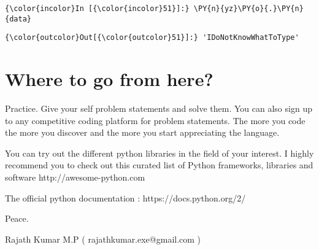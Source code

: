     \begin{Verbatim}[commandchars=\\\{\}]
{\color{incolor}In [{\color{incolor}51}]:} \PY{n}{yz}\PY{o}{.}\PY{n}{data}
\end{Verbatim}

            \begin{Verbatim}[commandchars=\\\{\}]
{\color{outcolor}Out[{\color{outcolor}51}]:} 'IDoNotKnowWhatToType'
\end{Verbatim}
        
    \section{Where to go from here?}\label{where-to-go-from-here}

    Practice. Give your self
problem statements and solve them. You can also sign up to any
competitive coding platform for problem statements. The more you code
the more you discover and the more you start appreciating the language.

You can try out the
different python libraries in the field of your interest. I highly
recommend you to check out this curated list of Python frameworks,
libraries and software http://awesome-python.com

The official python documentation : https://docs.python.org/2/

Peace.

Rajath Kumar M.P ( rajathkumar.exe@gmail.com )


    
    
    
    
